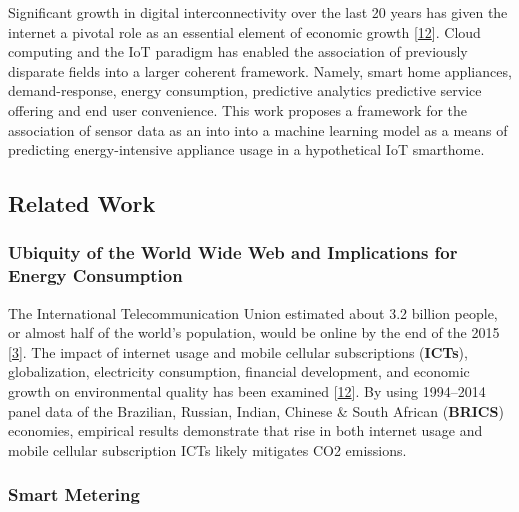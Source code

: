 \documentclass[11pt,]{article}
\begin{document}
Significant growth in digital interconnectivity over the last 20 years
has given the internet a pivotal role as an essential element of
economic growth
{[}\protect\hyperlink{ref-haseebDoesInformationCommunication2019}{12}{]}.
Cloud computing and the IoT paradigm has enabled the association of
previously disparate fields into a larger coherent framework. Namely,
smart home appliances, demand-response, energy consumption, predictive
analytics predictive service offering and end user convenience. This
work proposes a framework for the association of sensor data as an into
into a machine learning model as a means of predicting energy-intensive
appliance usage in a hypothetical IoT smarthome.

\hypertarget{related-work}{%
\subsection{Related Work}\label{related-work}}

\hypertarget{ubiquity-of-the-world-wide-web-and-implications-for-energy-consumption}{%
\subsubsection{Ubiquity of the World Wide Web and Implications for
Energy
Consumption}\label{ubiquity-of-the-world-wide-web-and-implications-for-energy-consumption}}

The International Telecommunication Union estimated about 3.2 billion
people, or almost half of the world's population, would be online by the
end of the 2015
{[}\protect\hyperlink{ref-InformationCommunicationTechnologies}{3}{]}.
The impact of internet usage and mobile cellular subscriptions
(\textbf{ICTs}), globalization, electricity consumption, financial
development, and economic growth on environmental quality has been
examined
{[}\protect\hyperlink{ref-haseebDoesInformationCommunication2019}{12}{]}.
By using 1994--2014 panel data of the Brazilian, Russian, Indian,
Chinese \& South African (\textbf{BRICS}) economies, empirical results
demonstrate that rise in both internet usage and mobile cellular
subscription ICTs likely mitigates CO2 emissions.

\hypertarget{smart-metering}{%
\subsubsection{Smart Metering}\label{smart-metering}}
\end{document}
